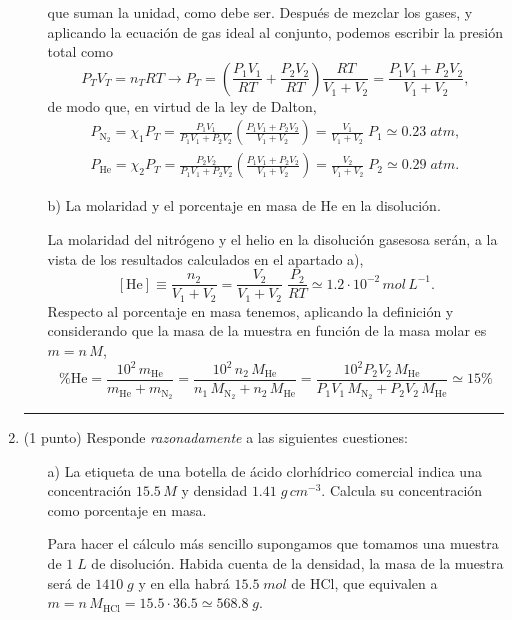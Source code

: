 \documentclass[a4paper,14pt]{extarticle}
\newcommand*\chem[1]{\ensuremath{\mathrm{#1}}}
\newcommand{\halmos}{
\vspace*{-1ex}

\begin{flushright}
\rule{1mm}{2.5mm} \end{flushright}
\vspace*{-1.5ex}

}
\renewcommand{\qed}{\halmos}
\begin{document}
\begin{enumerate}
\begin{itemize}
\begin{mdframed}[backgroundcolor=brown!10]
    		que suman la unidad, como debe ser.   		Después de mezclar los gases, y aplicando la ecuación de gas ideal al conjunto, podemos escribir la presión total como
    		$$P_TV_T=n_TRT\rightarrow P_T=\left(\frac{P_1V_1}{RT}+\frac{P_2V_2}{RT}\right)\frac{RT}{V_1+V_2}=\frac{P_1V_1+P_2V_2}{V_1+V_2},$$ 
    		de modo que, en virtud de la ley de Dalton,
    		\begin{eqnarray*}
    		P_\chem{N_2}=\chi_1P_T=\frac{P_1V_1}{P_1V_1+P_2V_2}\left(\frac{P_1V_1+P_2V_2}{V_1+V_2}\right)=\frac{V_1}{V_1+V_2}\;P_1\simeq 0.23\;atm,\\
    		P_\chem{He}=\chi_2P_T=\frac{P_2V_2}{P_1V_1+P_2V_2}\left(\frac{P_1V_1+P_2V_2}{V_1+V_2}\right)=\frac{V_2}{V_1+V_2}\;P_2\simeq 0.29\;atm.
    		\end{eqnarray*}
    		\end{mdframed}
    		\newpage
    		
    		\item[b)] La molaridad y el porcentaje en masa de $\chem{He}$ en la disolución.
    		\begin{mdframed}[backgroundcolor=brown!10]  
    		La molaridad del nitrógeno y el helio en la disolución gasesosa serán, a la vista de los resultados calculados en el apartado a), 
		\[[\chem{He}]\equiv\frac{n_2}{V_1+V_2}=\frac{V_2}{V_1+V_2}\;\frac{P_2}{RT}\simeq 1.2\cdot 10^{-2}\,mol\,L^{-1}. \]
    	Respecto al porcentaje en masa tenemos, aplicando la definición y considerando que la masa de la muestra en función de la masa molar es $m=n\,M$, 
    	\[\%\chem{He}\!=\!\frac{10^2\,m_\chem{He}}{m_\chem{He}+m_\chem{N_2}}\!=\!\frac{10^2\,n_2\,M_\chem{He}}{n_1\,M_\chem{N_2}+n_2\,M_\chem{He}}\!=\!\frac{10^2P_2V_2\,M_\chem{He}}{P_1V_1\,M_\chem{N_2}+P_2V_2\,M_\chem{He}}\simeq 15\%\]
    		\end{mdframed}
    	\end{itemize}
	\qed   
	
	\newpage
	
	
	\item (1 punto) Responde \textit{razonadamente} a las siguientes cuestiones:
		\begin{itemize}
			\item[a)] La etiqueta de una botella de ácido clorhídrico comercial indica una concentración $15.5\,M$ y densidad $1.41\;g\,cm^{-3}$. Calcula su concentración como porcentaje en masa.
			\begin{mdframed}[backgroundcolor=brown!10]  
			Para hacer el cálculo más sencillo supongamos que tomamos una muestra de $1\;L$ de disolución. Habida cuenta de la densidad, la masa de la muestra será de $1410\;g$ y en ella habrá $15.5\;mol$ de $\chem{HCl}$, que equivalen a $m=n\,M_\chem{HCl}=15.5\cdot 36.5\simeq 568.8\;g.$
			

\end{mdframed}
\end{itemize}
\end{enumerate}
\end{document}
